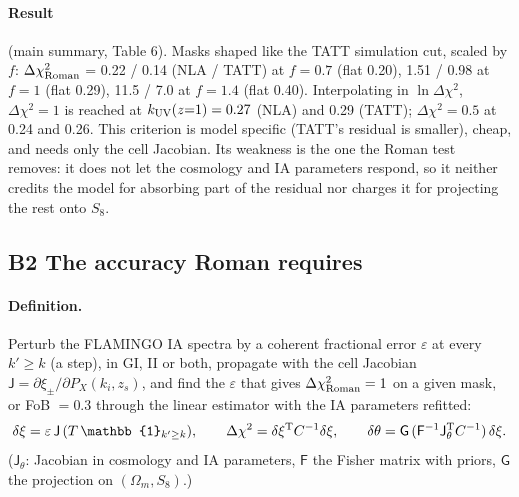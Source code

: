 \documentclass[11pt]{article}
\newcommand{\kuv}{k_{\rm UV}}
\newcommand{\dchi}{\Delta\chi^2}
\begin{document}
\paragraph{Result} (main summary, Table 6). Masks shaped like the TATT
simulation cut, scaled by $f$: $\dchi_{\rm Roman}$ = 0.22 / 0.14 (NLA /
TATT) at $f = 0.7$ (flat 0.20), 1.51 / 0.98 at $f = 1$ (flat 0.29), 11.5 /
7.0 at $f = 1.4$ (flat 0.40). Interpolating in $\ln\dchi$, $\dchi = 1$ is reached at
$\kuv(z{=}1) = 0.27$ (NLA) and 0.29 (TATT); $\dchi = 0.5$ at 0.24 and
0.26.
This criterion is model specific (TATT's residual is smaller), cheap, and
needs only the cell Jacobian. Its weakness is the one the Roman test
removes: it does not let the cosmology and IA parameters respond, so it
neither credits the model for absorbing part of the residual nor charges it
for projecting the rest onto $S_8$.

\subsection{B2 The accuracy Roman requires}\label{sec:tolerance}
\paragraph{Definition.} Perturb the FLAMINGO IA spectra by a coherent
fractional error $\varepsilon$ at every $k' \ge k$ (a step), in GI, II or
both, propagate with the cell Jacobian $\mathsf{J}=\partial\xi_\pm/\partial
P_X(k_i,z_s)$, and find the $\varepsilon$ that gives $\dchi_{\rm Roman} = 1$
on a given mask, or FoB $= 0.3$ through the linear estimator with the IA
parameters refitted:
\begin{equation}
\delta\xi = \varepsilon\,\mathsf{J}\,(T\,\mathbb{1}_{k'\ge k}),\qquad
\dchi = \delta\xi^{\rm T}C^{-1}\delta\xi,\qquad
\delta\theta = \mathsf{G}\,(\mathsf{F}^{-1}\mathsf{J}_\theta^{\rm T}C^{-1})\,\delta\xi .
\label{eq:tol}
\end{equation}
($\mathsf{J}_\theta$: Jacobian in cosmology and IA parameters, $\mathsf{F}$
the Fisher matrix with priors, $\mathsf{G}$ the projection on
$(\Omega_m, S_8)$.)
\end{document}
